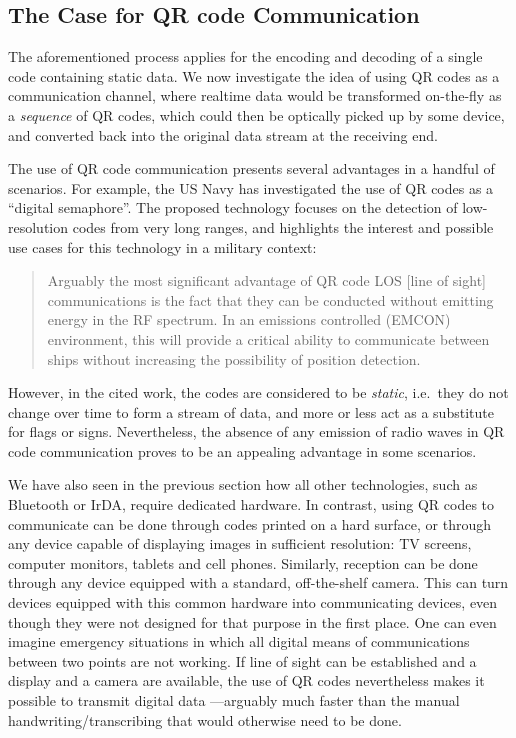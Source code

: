 \subsection{The Case for QR code Communication}

The aforementioned process applies for the encoding and decoding of a single code containing static data. We now investigate the idea of using QR codes as a communication channel, where realtime data would be transformed on-the-fly as a \emph{sequence} of QR codes, which could then be optically picked up by some device, and converted back into the original data stream at the receiving end.

The use of QR code communication presents several advantages in a handful of scenarios. For example, the US Navy has investigated the use of QR codes as a ``digital semaphore''. The proposed technology focuses on the detection of low-resolution codes from very long ranges, and highlights the interest and possible use cases for this technology in a military context:

\begin{quote}
Arguably the most significant advantage of QR code LOS [line of sight] communications is the fact that they can be conducted without emitting energy in the RF spectrum. In an emissions controlled (EMCON) environment, this will provide a critical ability to communicate between ships without increasing the possibility of position detection. \citep[p.\ 46]{richter-msc}
\end{quote}

However, in the cited work, the codes are considered to be \emph{static}, i.e.\ they do not change over time to form a stream of data, and more or less act as a substitute for flags or signs. Nevertheless, the absence of any emission of radio waves in QR code communication proves to be an appealing advantage in some scenarios.

We have also seen in the previous section how all other technologies, such as  Bluetooth or IrDA, require dedicated hardware. In contrast, using QR codes to communicate can be done through codes printed on a hard surface, or through any device capable of displaying images in sufficient resolution: TV screens, computer monitors, tablets and cell phones. Similarly, reception can be done through any device equipped with a standard, off-the-shelf camera. This can turn devices equipped with this common hardware into communicating devices, even though they were not designed for that purpose in the first place. One can even imagine emergency situations in which all digital means of communications between two points are not working. If line of sight can be established and a display and a camera are available, the use of QR codes nevertheless makes it possible to transmit digital data ---arguably much faster than the manual handwriting/transcribing that would otherwise need to be done.

